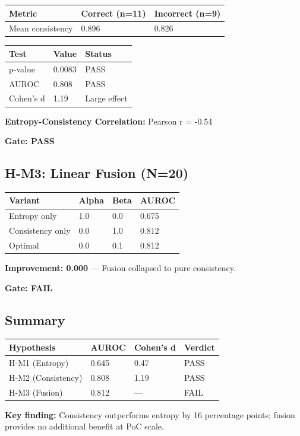 \begin{table}[h]
\centering
\begin{tabular}{lll}
\toprule
\textbf{Metric} & \textbf{Correct (n=11)} & \textbf{Incorrect (n=9)} \\
\midrule
Mean consistency & 0.896 & 0.826 \\
\bottomrule
\end{tabular}
\end{table}

\begin{table}[h]
\centering
\begin{tabular}{lll}
\toprule
\textbf{Test} & \textbf{Value} & \textbf{Status} \\
\midrule
p-value & 0.0083 & PASS \\
AUROC & 0.808 & PASS \\
Cohen's d & 1.19 & Large effect \\
\bottomrule
\end{tabular}
\end{table}

\textbf{Entropy-Consistency Correlation:} Pearson r = -0.54

\textbf{Gate: PASS}

\subsection{H-M3: Linear Fusion (N=20)}

\begin{table}[h]
\centering
\begin{tabular}{llll}
\toprule
\textbf{Variant} & \textbf{Alpha} & \textbf{Beta} & \textbf{AUROC} \\
\midrule
Entropy only & 1.0 & 0.0 & 0.675 \\
Consistency only & 0.0 & 1.0 & 0.812 \\
Optimal & 0.0 & 0.1 & 0.812 \\
\bottomrule
\end{tabular}
\end{table}

\textbf{Improvement: 0.000} --- Fusion collapsed to pure consistency.

\textbf{Gate: FAIL}

\subsection{Summary}

\begin{table}[h]
\centering
\begin{tabular}{llll}
\toprule
\textbf{Hypothesis} & \textbf{AUROC} & \textbf{Cohen's d} & \textbf{Verdict} \\
\midrule
H-M1 (Entropy) & 0.645 & 0.47 & PASS \\
H-M2 (Consistency) & 0.808 & 1.19 & PASS \\
H-M3 (Fusion) & 0.812 & --- & FAIL \\
\bottomrule
\end{tabular}
\end{table}

\textbf{Key finding:} Consistency outperforms entropy by 16 percentage points; fusion provides no additional benefit at PoC scale.
